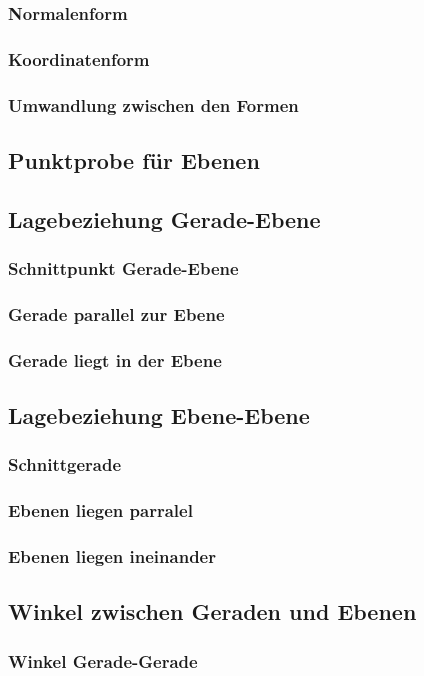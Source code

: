 \subsubsection{Normalenform}
\subsubsection{Koordinatenform}
\subsubsection{Umwandlung zwischen den Formen}
\subsection{Punktprobe für Ebenen}
\subsection{Lagebeziehung Gerade-Ebene}
\subsubsection{Schnittpunkt Gerade-Ebene}
\subsubsection{Gerade parallel zur Ebene}
\subsubsection{Gerade liegt in der Ebene}
\subsection{Lagebeziehung Ebene-Ebene}
\subsubsection{Schnittgerade}
\subsubsection{Ebenen liegen parralel}
\subsubsection{Ebenen liegen ineinander}
\subsection{Winkel zwischen Geraden und Ebenen}
\subsubsection{Winkel Gerade-Gerade}
